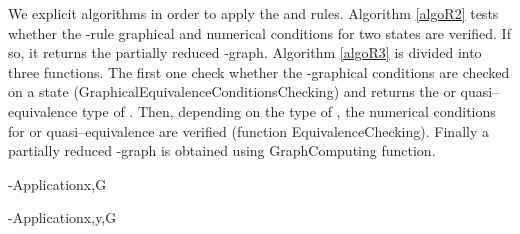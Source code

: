 \documentclass[11pt]{article}
\begin{document}
We explicit algorithms in order to apply the  and  rules. Algorithm \ref{algoR2} tests whether the -rule graphical and numerical conditions for two states are verified. If so, it returns the partially reduced -graph. 
 Algorithm \ref{algoR3} is divided into three functions. The first one check whether the -graphical conditions are checked on a state  ({\sc GraphicalEquivalenceConditionsChecking}) and returns the  or quasi--equivalence type of . Then, depending on the type of , the numerical conditions for  or quasi--equivalence are verified (function {\sc EquivalenceChecking}). Finally a partially reduced -graph is obtained using {\sc GraphComputing} function.
 
{\small


\begin{algorithm}[H]
 \begin{algo}{-Application}{x,G}
\FI
{}
\FI
{}
\end{algo}
\caption{Application of the  rule for a state}\label{algoR3}
\end{algorithm}
\begin{algorithm}[H]
 \begin{algo}{-Application}{x,y,G}
\FI
{}
\OD
{}
\FI
\OD

\OD
{}
\FI
\OD


\end{algo}
\end{algorithm}}
\end{document}
